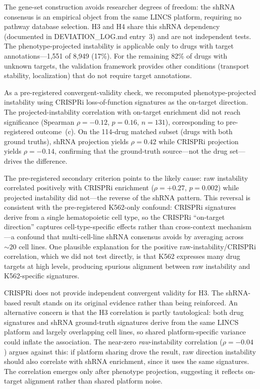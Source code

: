\documentclass[11pt]{article}
\begin{document}
The gene-set construction avoids researcher degrees of freedom: the shRNA
consensus is an empirical object from the same LINCS platform,
requiring no pathway database selection. H3 and H4 share this shRNA
dependency (documented in DEVIATION\_LOG.md entry~3) and are not
independent tests. The phenotype-projected instability is applicable only
to drugs with target annotations---1{,}551 of 8{,}949 (17\%). For the
remaining 82\% of drugs with unknown targets, the validation framework
provides other conditions (transport stability, localization) that do not
require target annotations.

As a pre-registered convergent-validity check, we recomputed
phenotype-projected instability using CRISPRi loss-of-function signatures
\citep{replogle2022mapping} as the on-target
direction. The projected-instability correlation with on-target enrichment
did not reach significance (Spearman $\rho = -0.12$, $p = 0.16$,
$n = 131$), corresponding to pre-registered outcome~(c). On the
114-drug matched subset (drugs with both ground truths), shRNA
projection yields $\rho = 0.42$ while CRISPRi projection yields
$\rho = -0.14$, confirming that the ground-truth source---not the
drug set---drives the difference.

The pre-registered secondary criterion points to the likely cause: raw
instability correlated positively with CRISPRi enrichment
($\rho = +0.27$, $p = 0.002$) while projected instability did not---the
reverse of the shRNA pattern. This reversal is consistent with the
pre-registered K562-only confound: CRISPRi signatures derive from a
single hematopoietic cell type, so the CRISPRi ``on-target direction''
captures cell-type-specific effects rather than cross-context
mechanism---a confound that multi-cell-line shRNA consensus avoids by
averaging across ${\sim}20$ cell lines. One plausible explanation for
the positive raw-instability/CRISPRi correlation, which we did not test
directly, is that K562 expresses many drug targets at high levels,
producing spurious alignment between raw instability and K562-specific
signatures.

CRISPRi does not provide independent convergent validity for H3. The
shRNA-based result stands on its original evidence rather than being
reinforced. An alternative concern is that the H3 correlation is
partly tautological: both drug signatures and shRNA ground-truth
signatures derive from the same LINCS platform and largely overlapping
cell lines, so shared platform-specific variance could inflate the
association. The near-zero \emph{raw}-instability correlation
($\rho = -0.04$) argues against this: if platform sharing drove the
result, raw direction instability should also correlate with shRNA enrichment, since
it uses the same signatures. The correlation emerges only after
phenotype projection, suggesting it reflects on-target alignment
rather than shared platform noise.
\end{document}
